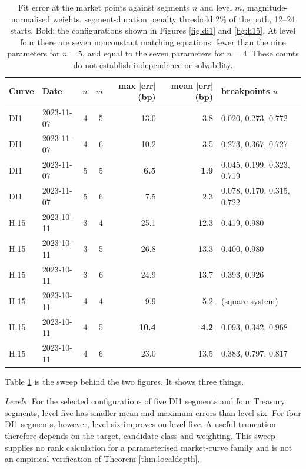 \documentclass[11pt,english]{article}
\theoremstyle{definition}
\theoremstyle{remark}
\begin{document}
\begin{table}[H]
\centering
\begin{tabular}{@{}llrrrrl@{}}
\toprule
Curve & Date & $n$ & $m$ & max $|$err$|$ (bp) & mean $|$err$|$ (bp) & breakpoints $u$ \\
\midrule
DI1 & 2023-11-07 & 4 & 5 & 13.0 & 3.8 & 0.020, 0.273, 0.772 \\
DI1 & 2023-11-07 & 4 & 6 & 10.2 & 3.5 & 0.273, 0.367, 0.727 \\
DI1 & 2023-11-07 & 5 & 5 & \textbf{6.5} & \textbf{1.9} & 0.045, 0.199, 0.323, 0.719 \\
DI1 & 2023-11-07 & 5 & 6 & 7.5 & 2.3 & 0.078, 0.170, 0.315, 0.722 \\
\midrule
H.15 & 2023-10-11 & 3 & 4 & 25.1 & 12.3 & 0.419, 0.980 \\
H.15 & 2023-10-11 & 3 & 5 & 26.8 & 13.3 & 0.400, 0.980 \\
H.15 & 2023-10-11 & 3 & 6 & 24.9 & 13.7 & 0.393, 0.926 \\
H.15 & 2023-10-11 & 4 & 4 & 9.9 & 5.2 & (square system) \\
H.15 & 2023-10-11 & 4 & 5 & \textbf{10.4} & \textbf{4.2} & 0.093, 0.342, 0.968 \\
H.15 & 2023-10-11 & 4 & 6 & 23.0 & 13.5 & 0.383, 0.797, 0.817 \\
\bottomrule
\end{tabular}
\caption{Fit error at the market points against segments $n$ and level
$m$, magnitude-normalised weights, segment-duration penalty threshold 2\% of the path, 12--24
starts. Bold: the configurations shown in Figures \ref{fig:di1} and
\ref{fig:h15}. At level four there are seven nonconstant matching equations: fewer
than the nine parameters for $n=5$, and equal to the seven parameters
for $n=4$. These counts do not establish independence or solvability.\label{tab:sweep}}
\end{table}

Table \ref{tab:sweep} is the sweep behind the two figures. It shows
three things.


\emph{Levels.} For the selected configurations of five DI1 segments
and four Treasury segments, level five has smaller mean and maximum
errors than level six. For four DI1 segments, however, level six
improves on level five. A useful truncation therefore depends on
the target, candidate class and weighting. This sweep supplies no
rank calculation for a parameterised market-curve family and is not
an empirical verification of Theorem \ref{thm:localdepth}.
\end{document}
